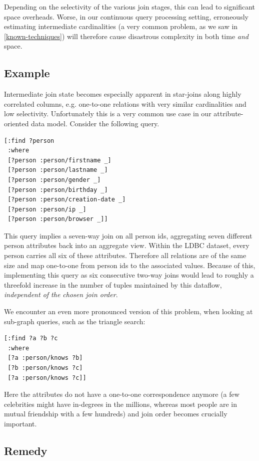 \documentclass[../catalog.tex]{subfiles}
\begin{document}
Depending on the selectivity of the various join stages, this can lead
to significant space overheads. Worse, in our continuous query
processing setting, erroneously estimating intermediate cardinalities
(a very common problem, as we saw in \autoref{known-techniques}) will
therefore cause disastrous complexity in both time \emph{and} space.

\subsection{Example}

Intermediate join state becomes especially apparent in star-joins
along highly correlated columns, e.g. one-to-one relations with very
similar cardinalities and low selectivity. Unfortunately this is a
very common use case in our attribute-oriented data model. Consider
the following query.

\begin{verbatim}
[:find ?person
 :where
 [?person :person/firstname _]
 [?person :person/lastname _]
 [?person :person/gender _]
 [?person :person/birthday _]
 [?person :person/creation-date _]
 [?person :person/ip _]
 [?person :person/browser _]]
\end{verbatim}

This query implies a seven-way join on all person ids, aggregating
seven different person attributes back into an aggregate view. Within
the LDBC dataset, every person carries all six of these
attributes. Therefore all relations are of the same size and map
one-to-one from person ids to the associated values. Because of this,
implementing this query as six consecutive two-way joins would lead to
roughly a threefold increase in the number of tuples maintained by
this dataflow, \emph{independent of the chosen join order}.

We encounter an even more pronounced version of this problem, when
looking at sub-graph queries, such as the triangle search:

\begin{verbatim}
[:find ?a ?b ?c
 :where
 [?a :person/knows ?b]
 [?b :person/knows ?c]
 [?a :person/knows ?c]]
\end{verbatim}

Here the attributes do not have a one-to-one correspondence anymore (a
few celebrities might have in-degrees in the millions, whereas most
people are in mutual friendship with a few hundreds) and join order
becomes crucially important.

\subsection{Remedy}
\end{document}
